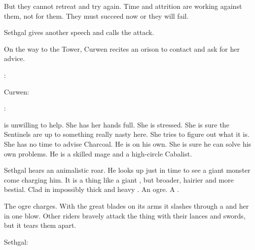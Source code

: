 But they cannot retreat and try again. 
Time and attrition are working against them, not for them. 
They must succeed now or they will fail. 

Sethgal gives another speech and calls the attack. 





\begin{comment}
  \subsection{Curwen contacts \Achsah}
\end{comment}
\new
On the way to the Tower, Curwen recites an orison to contact \Achsah and ask for her advice. 

\begin{prose}
  \Achsah:
  
  Curwen:
  
  \Achsah:
\end{prose}

\Achsah is unwilling to help. 
She has her hands full. 
She is stressed. 
She is sure the Sentinels are up to something really nasty here.
She tries to figure out what it is. 
She has no time to advise Charcoal. 
He is on his own.
She is sure he can solve his own problems. 
He is a skilled mage and a high-circle Cabalist. 





\begin{comment}
  \subsection{Nephil amputee}
\end{comment}
\new
Sethgal hears an animalistic roar. 
He looks up just in time to see a giant monster come charging him.
It is a thing like a giant \human, but broader, hairier and more bestial. 
Clad in impossibly thick and heavy \armour. 
An ogre. 
A \nephil. 

The ogre charges. 
With the great blades on its arms it slashes through a \scatha and her \relc in one blow. 
Other riders bravely attack the thing with their lances and swords, but it tears them apart. 

Sethgal:

